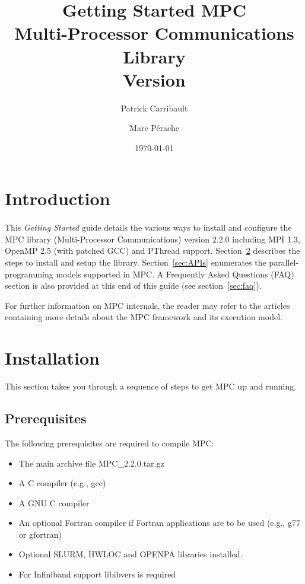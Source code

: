 \documentclass[a4paper,11pt]{article}
\title{Getting Started MPC\\Multi-Processor Communications Library\\Version {\MPCVERSION}}
\author{Patrick Carribault \and Marc P\'{e}rache}
\date{\today}
\def\MPCVERSION{2.2.0}
\begin{document}
\maketitle
\tableofcontents

\section{Introduction}

\paragraph{}
This \textit{Getting Started} guide details the various ways to install and configure the MPC library
(Multi-Processor Communications) version {\MPCVERSION} including MPI 1.3, OpenMP 2.5 (with patched GCC) and PThread support.
Section~\ref{sec:installation} describes the steps to install and setup the library.
Section~\ref{sec:APIs} enumerates the parallel-programming models supported in MPC.
A Frequently Asked Questions (FAQ) section is also provided at this end of this guide (see section~\ref{sec:faq}).

For further information on MPC internals, the reader may refer to the
articles~\cite{Perache08,Perache09,Carribault10} containing more details about the MPC
framework and its execution model.

\section{Installation}
\label{sec:installation}

This section takes you through a sequence of steps to get MPC up and running.

\subsection{Prerequisites}

The following prerequisites are required to compile MPC:
\begin{itemize}
    \item  The main archive file MPC\_{\MPCVERSION}.tar.gz

    \item  A C compiler (e.g., gcc)

    \item  A GNU C compiler

    \item  An optional Fortran compiler if Fortran applications are to be used
      (e.g., g77 or gfortran)
      
    \item  Optional SLURM, HWLOC and OPENPA libraries installed.

    \item  For Infiniband support libibvers is required
\end{itemize}
\end{document}
